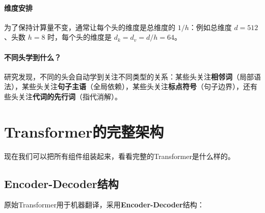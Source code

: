 \paragraph{维度安排}

为了保持计算量不变，通常让每个头的维度是总维度的 $1/h$：例如总维度 $d = 512$、头数 $h = 8$ 时，每个头的维度是 $d_k = d_v = d/h = 64$。


\paragraph{不同头学到什么？}

研究发现，不同的头会自动学到关注不同类型的关系：某些头关注\textbf{相邻词}（局部语法），某些头关注\textbf{句子主语}（全局依赖），某些头关注\textbf{标点符号}（句子边界），还有些头关注\textbf{代词的先行词}（指代消解）。


\section{Transformer的完整架构}

现在我们可以把所有组件组装起来，看看完整的Transformer是什么样的。

\subsection{Encoder-Decoder结构}

原始Transformer用于机器翻译，采用\textbf{Encoder-Decoder}结构：

